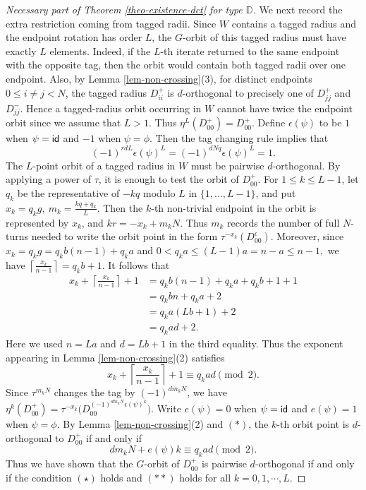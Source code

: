\documentclass[12pt]{article}
\theoremstyle{plain}
\theoremstyle{definition}
\DeclareMathOperator{\id}{\sf id}
\renewcommand{\leq}{\leqslant}
\begin{document}
\begin{proof}[Necessary part of Theorem \ref{theo-existence-dct} for type $\mathbb{D}$]
We next record the extra restriction coming from tagged radii. Since \(W\)
contains a tagged radius and the endpoint rotation has order \(L\), the
\(G\)-orbit of this tagged radius must have exactly \(L\) elements. Indeed, if
the \(L\)-th iterate returned to the same endpoint with the opposite tag, then
the orbit would contain both tagged radii over one endpoint. Also, by Lemma \ref{lem-non-crossing}(3), for
distinct endpoints \(0\leq i\neq j<N\), the tagged radius \(D_{ii}^{+}\) is
\(d\)-orthogonal to precisely one of \(D_{jj}^{+}\) and \(D_{jj}^{-}\). Hence a
tagged-radius orbit occurring in \(W\) cannot have twice the endpoint orbit since we assume that $L>1$. Thus 
\(\eta^L(D_{00}^+)=D_{00}^+.\)
Define $\epsilon(\psi)$ to be $1$ when $\psi=\id$ and $-1$ when $\psi=\phi$. Then the tag changing rule  implies that  
\[(-1)^{rdL}\epsilon(\psi)^L=(-1)^{dNq}\epsilon(\psi)^L=1.\tag{$\star$}\]
The \(L\)-point orbit of a tagged radius in $W$ must be pairwise
\(d\)-orthogonal. By applying a power of \(\tau\), it is enough to test the
orbit of \(D_{00}^{+}\). For \(1\leq k\leq L-1\), let \(q_k\) be the
representative of \(-kq\) modulo \(L\) in \(\{1,\ldots,L-1\}\), and put
\(x_k=q_k g,\ m_k=\frac{kq+q_k}{L}.\)
Then the \(k\)-th non-trivial endpoint in the orbit is represented by \(x_k\),
and
\(kr=-x_k+m_kN.\)
Thus \(m_k\) records the number of full \(N\)-turns needed to write the orbit
point in the form \(\tau^{-x_k}(D_{00}^{\epsilon})\). Moreover, since
\(x_k=q_kg=q_kb(n-1)+q_ka\)
and
\(0<q_ka\leq (L-1)a=n-a\leq n-1,\)
we have
\(\left\lceil\frac{x_k}{n-1}\right\rceil=q_kb+1.\)
It follows that
\[
\begin{aligned}
x_k+\left\lceil\frac{x_k}{n-1}\right\rceil+1
&=q_kb(n-1)+q_ka+q_kb+1+1\\
&=q_kbn+q_ka+2\\
&=q_ka(Lb+1)+2\\
&=q_kad+2.
\end{aligned}
\]
Here we used \(n=La\) and \(d=Lb+1\) in the third equality. Thus the exponent
appearing in Lemma \ref{lem-non-crossing}(2) satisfies
\[
x_k+\left\lceil\frac{x_k}{n-1}\right\rceil+1
\equiv q_kad\pmod2.
\tag{$*$}
\]
Since
\(\tau^{m_kN}\) changes the tag by \((-1)^{dm_kN}\), we have
\(\eta^k(D_{00}^{+}) =\tau^{-x_k}\bigl(D_{00}^{(-1)^{dm_kN}\epsilon(\psi)^k}\bigr).\)
Write \(e(\psi)=0\) when \(\psi=\id\) and \(e(\psi)=1\) when
\(\psi=\phi\).  By Lemma \ref{lem-non-crossing}(2) and \((*)\), the
\(k\)-th orbit point is \(d\)-orthogonal to \(D_{00}^{+}\) if and only if
\[
dm_kN+e(\psi)k\equiv q_kad\pmod2.
\tag{$**$}
\]
Thus we have shown that the $G$-orbit of $D_{00}^+$ is pairwise $d$-orthogonal if and only if the condition $(\star)$ holds and $(**)$ holds for all $k=0,1,\cdots,L$. 


\end{proof}
\end{document}
